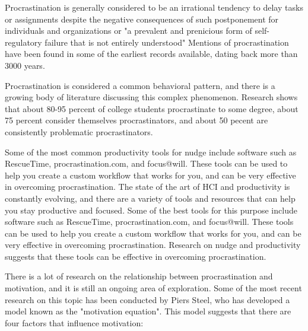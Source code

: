 

Procrastination is generally considered to be an irrational
tendency to delay tasks or assignments despite the negative
consequences of such postponement for individuals and organizations\cite{hen2018causes}  \cite{lay1986last} or "a prevalent and prenicious form of self-regulatory failure that is not entirely understood"
Mentions of procrastination have been found in some of the earliest records available, dating back more than 3000 years. \cite{Piers2007}



Procrastination is considered a common behavioral pattern,
and there is a growing body of literature discussing this complex phenomenon.\cite{Yan2022}
Research shows that about 80-95 percent of college students procrastinate to some degree, about 75
percent consider themselves  procrastinators, and about 50 pecent are consistently problematic procrastinators. \cite{Steel2007}







Some of the most common productivity tools for nudge include software such as RescueTime, procrastination.com, and focus@will. These tools can be used to help you create a custom workflow that works for you, and can be very effective in overcoming procrastination.
The state of the art of HCI and productivity is constantly evolving, and there are a variety of tools and resources that can help you stay productive and focused. Some of the best tools for this purpose include software such as RescueTime, procrastination.com, and focus@will. These tools can be used to help you create a custom workflow that works for you, and can be very effective in overcoming procrastination.
Research on nudge and productivity suggests that these tools can be effective in overcoming procrastination.



There is a lot of research on the relationship between procrastination and motivation,
and it is still an ongoing area of exploration. Some of the most recent research on this topic has been conducted by Piers Steel, who has developed a model known as the "motivation equation". This model suggests that there are four factors that influence motivation:


